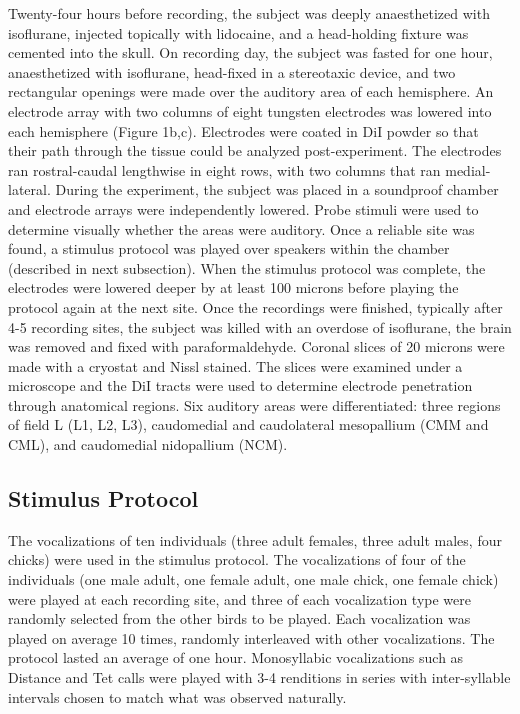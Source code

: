     Twenty-four hours before recording, the subject was deeply anaesthetized with isoflurane, injected topically with lidocaine, and a head-holding fixture was cemented into the skull. On recording day, the subject was fasted for one hour, anaesthetized with isoflurane, head-fixed in a stereotaxic device, and two rectangular openings were made over the auditory area of each hemisphere. An electrode array with two columns of eight tungsten electrodes was lowered into each hemisphere (Figure 1b,c). Electrodes were coated in DiI powder so that their path through the tissue could be analyzed post-experiment. The electrodes ran rostral-caudal lengthwise in eight rows, with two columns that ran medial-lateral.
    During the experiment, the subject was placed in a soundproof chamber and electrode arrays were independently lowered. Probe stimuli were used to determine visually whether the areas were auditory. Once a reliable site was found, a stimulus protocol was played over speakers within the chamber (described in next subsection). When the stimulus protocol was complete, the electrodes were lowered deeper by at least 100 microns before playing the protocol again at the next site.
Once the recordings were finished, typically after 4-5 recording sites, the subject was killed with an overdose of isoflurane, the brain was removed and fixed with paraformaldehyde. Coronal slices of 20 microns were made with a cryostat and Nissl stained. The slices were examined under a microscope and the DiI tracts were used to determine electrode penetration through anatomical regions. Six auditory areas were differentiated: three regions of field L (L1, L2, L3), caudomedial and caudolateral mesopallium (CMM and CML), and caudomedial nidopallium (NCM).

\subsection{Stimulus Protocol}

    The vocalizations of ten individuals (three adult females, three adult males, four chicks) were used in the stimulus protocol. The vocalizations of four of the individuals (one male adult, one female adult, one male chick, one female chick) were played at each recording site, and three of each vocalization type were randomly selected from the other birds to be played. Each vocalization was played on average 10 times, randomly interleaved with other vocalizations. The protocol lasted an average of one hour. Monosyllabic vocalizations such as Distance and Tet calls were played with 3-4 renditions in series with inter-syllable intervals chosen to match what was observed naturally.

